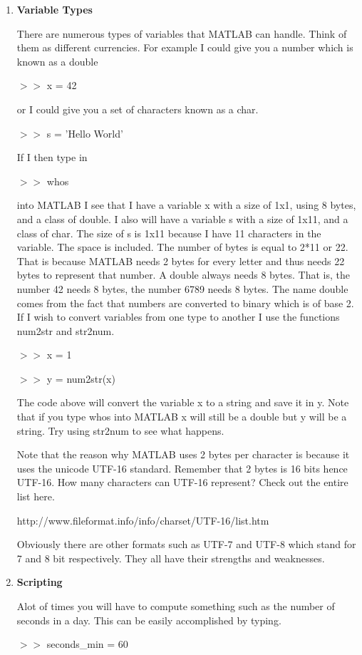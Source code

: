 \begin{enumerate}
\item \textbf{ Variable Types}

There are numerous types of variables that MATLAB can handle. Think of
them as different currencies. For example I could give you a number
which is known as a double

$>>$ x = 42

or I could give you a set of characters known as a char.

$>>$ s = 'Hello World'

If I then type in 

$>>$ whos 

into MATLAB I see that I have a variable x with a size of 1x1, using 8
bytes, and a class of double. I also will have a variable s with a
size of 1x11, and a class of char. The size of s is 1x11 because I
have 11 characters in the variable. The space is included. The number
of bytes is equal to 2*11 or 22. That is because MATLAB needs 2 bytes
for every letter and thus needs 22 bytes to represent that number. A
double always needs 8 bytes. That is, the number 42 needs 8 bytes, the
number 6789 needs 8 bytes. The name double comes from the fact that
numbers are converted to binary which is of base 2. If I wish to
convert variables from one type to another I use the functions num2str
and str2num. 

$>>$ x = 1

$>>$ y = num2str(x)

The code above will convert the variable x to a string and save it in
y. Note that if you type whos into MATLAB x will still be a double but
y will be a string. Try using str2num to see what happens.

Note that the reason why MATLAB uses 2 bytes per character is because
it uses the unicode UTF-16 standard. Remember that 2 bytes is 16 bits
hence UTF-16. How many characters can UTF-16 represent? Check out the
entire list here.

http://www.fileformat.info/info/charset/UTF-16/list.htm

Obviously there are other formats such as UTF-7 and UTF-8 which stand
for 7 and 8 bit respectively. They all have their strengths and
weaknesses. 

\item \textbf{Scripting}

Alot of times you will have to compute something such as the number of
seconds in a day. This can be easily accomplished by typing.

$>>$ seconds\_min = 60


\end{enumerate}
